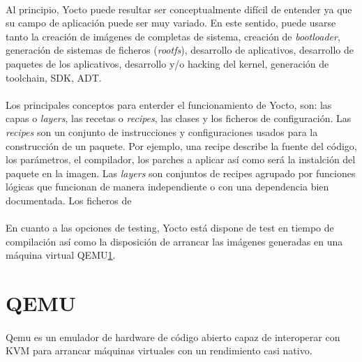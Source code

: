 \paragraph{}Al principio, Yocto puede resultar ser conceptualmente difícil de entender
ya que su campo de aplicación puede ser muy variado. En este sentido, puede usarse tanto
la creación de imágenes de completas de sistema, creación de \emph{\gls{bootloader}}, generación
de sistemas de ficheros (\emph{rootfs}), desarrollo de aplicativos, desarrollo de paquetes
de los aplicativos, desarrollo y/o hacking del kernel, generación de toolchain, \gls{SDK},
\gls{ADT}.

\paragraph{\label{layers} \label{recipes}}Los principales conceptos para enterder el funcionamiento de Yocto, son:
las capas o \emph{layers}, las recetas o \emph{recipes}, las clases y los ficheros de
configuración. Las \emph{recipes} son un conjunto de instrucciones y configuraciones
usados para la construcción de un paquete. Por ejemplo, una recipe describe la fuente
del código, los parámetros, el compilador, los parches a aplicar así como será la instalción
del paquete en la imagen. Las \emph{layers} son conjuntos de recipes agrupado por
funciones lógicas que funcionan de manera independiente o con una dependencia bien
documentada. Los ficheros de




\paragraph{}En cuanto a las opciones de testing, Yocto está dispone de test en tiempo de compilación
así como la disposición de arrancar las imágenes generadas en una máquina virtual QEMU\ref{sec:qemu}.

\section{QEMU}\label{sec:qemu}

\paragraph{} Qemu es un emulador de hardware de código abierto capaz de interoperar con
\gls{KVM} para arrancar máquinas virtuales con un rendimiento casi nativo.
\cite{qemu}

